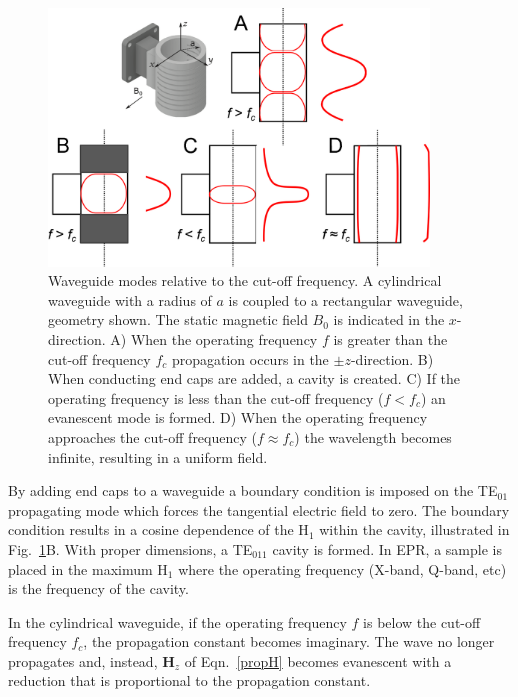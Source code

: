 \begin{figure}[ht]
 \centering
 \includegraphics[width=0.9\textwidth]{Kapitel/Ch2-Images/Ch2-UniformFieldWaveguide.eps}
 \caption[Waveguide modes relative to the cut-off frequency]{Waveguide modes relative to the cut-off frequency. A cylindrical waveguide with a radius of $a$ is coupled to a rectangular waveguide, geometry shown. The static magnetic field $B_0$ is indicated in the $x$-direction. A) When the operating frequency $f$ is greater than the cut-off frequency $f_c$ propagation occurs in the $\pm z$-direction. B) When conducting end caps are added, a cavity is created. C) If the operating frequency is less than the cut-off frequency ($f < f_c$) an evanescent mode is formed. D) When the operating frequency approaches the cut-off frequency ($f \approx f_c$) the wavelength becomes infinite, resulting in a uniform field. }
 \label{fig:UFwaveguide}
\end{figure}

By adding end caps to a waveguide a boundary condition is imposed on the TE$_{01}$ propagating mode which forces the tangential electric field to zero. The boundary condition results in a cosine dependence of the H$_1$ within the cavity, illustrated in Fig.~\ref{fig:UFwaveguide}B. With proper dimensions, a TE$_{011}$ cavity is formed. In EPR, a sample is placed in the maximum H$_1$ where the operating frequency (X-band, Q-band, etc) is the frequency of the cavity. 

In the cylindrical waveguide, if the operating frequency $f$ is below the cut-off frequency $f_c$, the propagation constant becomes imaginary. The wave no longer propagates and, instead, $\mathbf{H}_z$ of Eqn.~\ref{propH} becomes evanescent with a reduction that is proportional to the propagation constant. 

